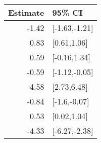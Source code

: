 \begin{tabular}{rl}
  \hline
Estimate & 95\% CI \\ 
  \hline
-1.42 & [-1.63,-1.21] \\ 
  0.83 & [0.61,1.06] \\ 
  0.59 & [-0.16,1.34] \\ 
  -0.59 & [-1.12,-0.05] \\ 
  4.58 & [2.73,6.48] \\ 
  -0.84 & [-1.6,-0.07] \\ 
  0.53 & [0.02,1.04] \\ 
  -4.33 & [-6.27,-2.38] \\ 
   \hline
\end{tabular}

